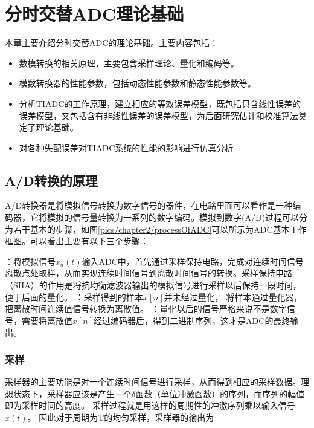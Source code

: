 
\chapter{分时交替ADC理论基础}
本章主要介绍分时交替ADC的理论基础。主要内容包括：
\begin {itemize}
	\item 数模转换的相关原理，主要包含采样理论、量化和编码等。
	\item 模数转换器的性能参数，包括动态性能参数和静态性能参数等。
	\item 分析TIADC的工作原理，建立相应的等效误差模型，既包括只含线性误差的误差模型，又包括含有非线性误差的误差模型，为后面研究估计和校准算法奠定了理论基础。
	\item 对各种失配误差对TIADC系统的性能的影响进行仿真分析
\end {itemize}
\section {A/D转换的原理}
	A/D转换器是将模拟信号转换为数字信号的器件，在电路里面可以看作是一种编码器，它将模拟的信号量转换为一系列的数字编码。模拟到数字(A/D)过程可以分为若干基本的步骤，如图\ref{pics/chapter2/processOfADC}可以所示为ADC基本工作框图。可以看出主要有以下三个步骤：

	\begin {enumerate}
		：将模拟信号$x_{a}\left( t \right)$输入ADC中，首先通过采样保持电路，完成对连续时间信号 离散点处取样，从而实现连续时间信号到离散时间信号的转换。采样保持电路（SHA）的作用是将抗均衡滤波器输出的模拟信号进行采样以后保持一段时间，便于后面的量化。
		：采样得到的样本$x\left[ n \right]$并未经过量化， 将样本通过量化器，把离散时间连续值信号转换为离散值。
		：量化以后的信号严格来说不是数字信号，需要将离散值$\hat x\left[ n \right]$经过编码器后，得到二进制序列，这才是ADC的最终输出。
	\end {enumerate}
	\subsection {采样}
	采样器的主要功能是对一个连续时间信号进行采样，从而得到相应的采样数据。理想状态下，采样器应该是产生一个$\delta $函数（单位冲激函数）的序列，而序列的幅值即为采样时间的高度。
	采样过程就是用这样的周期性的冲激序列乘以输入信号$x(t)$。
	因此对于周期为T的均匀采样，采样器的输出为
	
